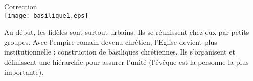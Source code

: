 \documentclass{beamer}
\begin{document}
      \begin{frame} Correction \\
           
                \texttt{[image: basilique1.eps]}
               
            \end{frame}
    
    
     
     
     \begin{frame}
     Au début, les fidèles sont surtout urbains. Ils se réunissent chez eux par petits groupes.  Avec l'empire romain devenu chrétien, l'Eglise devient plus institutionnelle : construction de basiliques chrétiennes. Ils s'organisent et définissent une hiérarchie pour assurer l'unité (l'évêque est la personne la plus importante).
     \end{frame}
     
    
  
\end{document}
